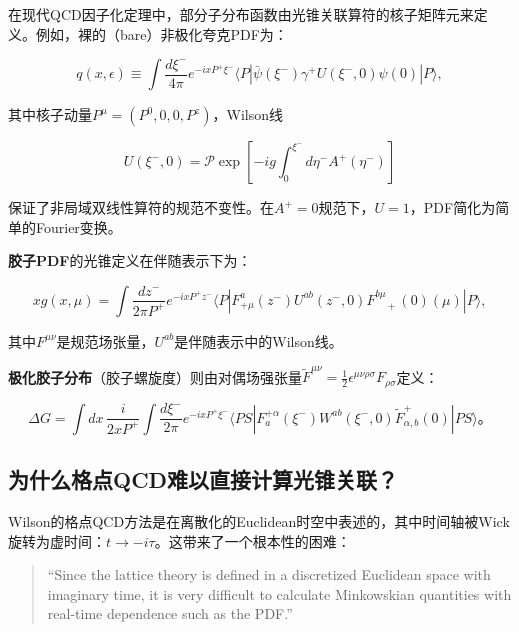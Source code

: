 \documentclass[12pt,a4paper]{ctexart}
\theoremstyle{definition}
\begin{document}
在现代QCD因子化定理中\cite{Izubuchi2018}，部分子分布函数由光锥关联算符的核子矩阵元来定义。例如，裸的（bare）非极化夸克PDF为\cite{Izubuchi2018}：

\begin{equation}
q(x, \epsilon) \equiv \int \frac{d\xi^-}{4\pi} e^{-ixP^+\xi^-} \langle P| \bar{\psi}(\xi^-) \gamma^+ U(\xi^-, 0) \psi(0) |P\rangle,
\label{eq:lightcone_quark_pdf}
\end{equation}

其中核子动量$P^\mu = (P^0, 0, 0, P^z)$，Wilson线

\begin{equation}
U(\xi^-, 0) = \mathcal{P} \exp\left[-ig \int_0^{\xi^-} d\eta^- A^+(\eta^-)\right]
\label{eq:wilson_line}
\end{equation}

保证了非局域双线性算符的规范不变性。在$A^+ = 0$规范下，$U = 1$，PDF简化为简单的Fourier变换。

\textbf{胶子PDF}的光锥定义在伴随表示下为\cite{Chen2025gluon}：

\begin{equation}
xg(x, \mu) = \int \frac{dz^-}{2\pi P^+} e^{-ixP^+z^-} \langle P| F^a_{+\mu}(z^-) U^{ab}(z^-, 0) F^{b\mu}_{\phantom{b\mu}+}(0)(\mu) |P\rangle,
\label{eq:lightcone_gluon_pdf}
\end{equation}

其中$F^{\mu\nu}$是规范场张量，$U^{ab}$是伴随表示中的Wilson线。

\textbf{极化胶子分布}（胶子螺旋度）则由对偶场强张量$\tilde{F}^{\mu\nu} = \frac{1}{2}\epsilon^{\mu\nu\rho\sigma}F_{\rho\sigma}$定义\cite{Egerer2022}：

\begin{equation}
\Delta G = \int dx\, \frac{i}{2xP^+} \int \frac{d\xi^-}{2\pi} e^{-ixP^+\xi^-} \langle PS| F^{+\alpha}_a(\xi^-) W^{ab}(\xi^-, 0) \tilde{F}^+_{\alpha,b}(0) |PS\rangle。
\label{eq:DeltaG_lightcone}
\end{equation}

\subsection{为什么格点QCD难以直接计算光锥关联？}

Wilson的格点QCD方法\cite{Ji2013Euclidean}是在离散化的Euclidean时空中表述的，其中时间轴被Wick旋转为虚时间：$t \to -i\tau$。这带来了一个根本性的困难：

\begin{quote}
``Since the lattice theory is defined in a discretized Euclidean space with imaginary time, it is very difficult to calculate Minkowskian quantities with real-time dependence such as the PDF.''\cite{Izubuchi2018}
\end{quote}
\end{document}
